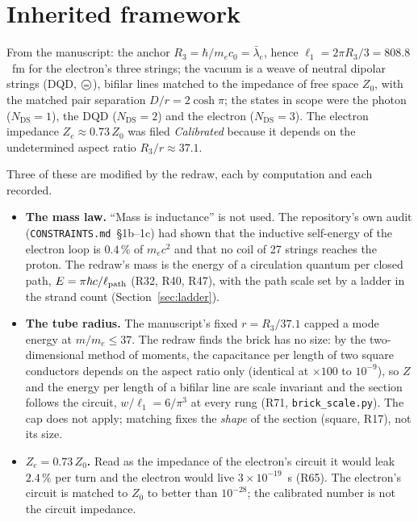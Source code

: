 \documentclass[11pt,a4paper]{article}
\theoremstyle{plain}
\theoremstyle{remark}
\newcommand{\dqd}{\ensuremath{\ooalign{$\bigcirc$\cr\hfil\scalebox{0.7}{$=$}\hfil}}}
\newcommand{\Ncd}{\ensuremath{N_{\mathrm{DS}}}}
\newcommand{\lb}{\ensuremath{\bar\lambda_e}}
\newcommand{\lone}{\ensuremath{\ell_1}}
\begin{document}
\section{Inherited framework}\label{sec:inherited}

From the manuscript: the anchor $R_3 = \hbar/m_e c_0 = \lb$, hence $\lone = 2\pi R_3/3 = 808.8$~fm
for the electron's three strings; the vacuum is a weave of neutral dipolar strings (DQD, \dqd),
bifilar lines matched to the impedance of free space $Z_0$, with the matched pair separation
$D/r = 2\cosh\pi$; the states in scope were the photon ($\Ncd = 1$), the DQD ($\Ncd = 2$) and the
electron ($\Ncd = 3$). The electron impedance $Z_e \approx 0.73\,Z_0$ was filed \emph{Calibrated}
because it depends on the undetermined aspect ratio $R_3/r \approx 37.1$.

Three of these are modified by the redraw, each by computation and each recorded.

\begin{itemize}[nosep]
\item \textbf{The mass law.} ``Mass is inductance'' is not used. The repository's own audit
(\texttt{CONSTRAINTS.md}~\S1b--1c) had shown that the inductive self-energy of the electron loop is
$0.4\,\%$ of $m_e c^2$ and that no coil of 27 strings reaches the proton. The redraw's mass is the
energy of a circulation quantum per closed path, $E = \pi\hbar c/\ell_{\rm path}$ (R32, R40, R47),
with the path scale set by a ladder in the strand count (Section~\ref{sec:ladder}).
\item \textbf{The tube radius.} The manuscript's fixed $r = R_3/37.1$ capped a mode energy at
$m/m_e \le 37$. The redraw finds the brick has no size: by the two-dimensional method of moments,
the capacitance per length of two square conductors depends on the aspect ratio only (identical at
$\times 100$ to $10^{-9}$), so $Z$ and the energy per length of a bifilar line are scale
invariant and the section follows the circuit, $w/\lone = 6/\pi^3$ at every rung (R71,
\texttt{brick\_scale.py}). The cap does not apply; matching fixes the \emph{shape} of the section
(square, R17), not its size.
\item \textbf{$Z_e = 0.73\,Z_0$.} Read as the impedance of the electron's circuit it would leak
$2.4\,\%$ per turn and the electron would live $3\times10^{-19}$~s (R65). The electron's circuit is
matched to $Z_0$ to better than $10^{-28}$; the calibrated number is not the circuit impedance.
\end{itemize}
\end{document}

